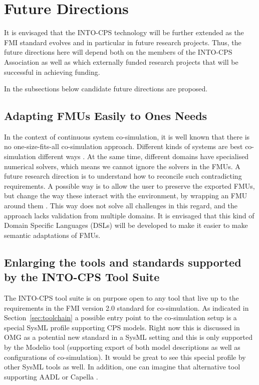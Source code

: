 %
%
%
\section{Future Directions}\label{sec:future}


It is envisaged that the INTO-CPS technology will be further extended as the FMI standard evolves and in particular in future research projects. 
Thus, the future directions here will depend both on the members of the INTO-CPS Association as well as which externally funded research projects that will be successful in achieving funding. 

In the subsections below candidate future directions are proposed.

\subsection{Adapting FMUs Easily to Ones Needs}

In the context of continuous system co-simulation, it is well known that there is no one-size-fits-all co-simulation approach. 
Different kinds of systems are best co-simulation different ways \cite{Gomes2018}.
At the same time, different domains have specialised numerical solvers, which means we cannot ignore the solvers in the FMUs.
A future research direction is to understand how to reconcile such contradicting requirements.
A possible way is to allow the user to preserve the exported FMUs, but change the way these interact with the environment, by wrapping an FMU around them \cite{Gomes&18a}.
This way does not solve all challenges in this regard, and the approach lacks validation from multiple domains. It is envisaged that this kind of Domain Specific Languages (DSLs) will be developed to make it easier to make semantic adaptations of FMUs.


\subsection{Enlarging the tools and standards supported by the INTO-CPS Tool Suite}

The INTO-CPS tool suite is on purpose open to any tool that live up to the requirements in the FMI version 2.0 standard for co-simulation. As indicated in Section~\ref{sec:toolchain} a possible entry point to the co-simulation setup is a special SysML profile supporting CPS models. Right now this is discussed in OMG as a potential new standard in a SysML setting and this is only supported by the Modelio tool (supporting export of both model descriptions as well as configurations of co-simulation). It would be great to see this special profile by other SysML tools as well. In addition, one can imagine that alternative tool supporting AADL \cite{AADL04} or Capella \cite{Roques17}.

